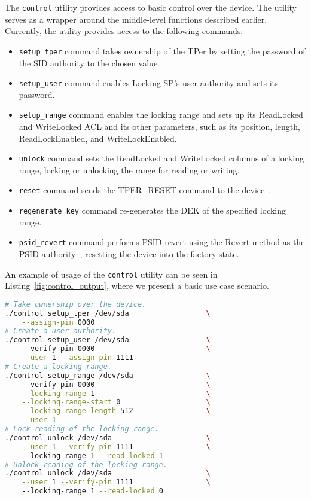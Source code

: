 The \verb|control| utility provides access to basic control over the device.
The utility serves as a wrapper around the middle-level functions described earlier.
Currently, the utility provides access to the following commands:

\begin{itemize}
    \item \verb|setup_tper| command takes ownership of the TPer by setting the password of the SID authority to the chosen value.
    \item \verb|setup_user| command enables Locking SP's user authority and sets its password.
    \item \verb|setup_range| command enables the locking range and sets up its ReadLocked and WriteLocked ACL and its other parameters, such as its position, length, ReadLockEnabled, and WriteLockEnabled.
    \item \verb|unlock| command sets the ReadLocked and WriteLocked columns of a locking range, locking or unlocking the range for reading or writing.
    \item \verb|reset| command sends the TPER\_RESET command to the device~\cite{tcg-storage-core}.
    \item \verb|regenerate_key| command re-generates the DEK of the specified locking range.
    \item \verb|psid_revert| command performs PSID revert using the Revert method as the PSID authority~\cite{tcg-psid}, resetting the device into the factory state.

\end{itemize}

An example of usage of the \verb|control| utility can be seen in Listing~\ref{fig:control_output}, where we present a basic use case scenario.

    \begin{lstlisting}[language=bash,caption={Usage of the \texttt{control} utility},label={fig:control_output},keywordstyle=\color{black}]
# Take ownership over the device.
./control setup_tper /dev/sda                  \
    --assign-pin 0000
# Create a user authority.
./control setup_user /dev/sda                  \ 
    --verify-pin 0000                          \
    --user 1 --assign-pin 1111
# Create a locking range.
./control setup_range /dev/sda                 \ 
    --verify-pin 0000                          \
    --locking-range 1                          \
    --locking-range-start 0                    \
    --locking-range-length 512                 \
    --user 1
# Lock reading of the locking range.
./control unlock /dev/sda                      \
    --user 1 --verify-pin 1111                 \ 
    --locking-range 1 --read-locked 1
# Unlock reading of the locking range.
./control unlock /dev/sda                      \
    --user 1 --verify-pin 1111                 \ 
    --locking-range 1 --read-locked 0
\end{lstlisting}


